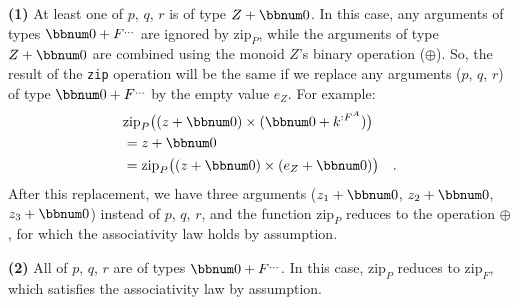 \textbf{(1)} At least one of $p$, $q$, $r$ is of type $Z+\bbnum 0$.
In this case, any arguments of types $\bbnum 0+F^{...}$ are ignored
by $\text{zip}_{P}$, while the arguments of type $Z+\bbnum 0$ are
combined using the monoid $Z$\textsf{'}s binary operation ($\oplus$). So,
the result of the \lstinline!zip! operation will be the same if we
replace any arguments ($p$, $q$, $r$) of type $\bbnum 0+F^{...}$
by the empty value $e_{Z}$. For example:
\begin{align*}
 & \text{zip}_{P}\big((z+\bbnum 0)\times(\bbnum 0+k^{:F^{A}})\big)\\
 & =z+\bbnum 0\\
 & =\text{zip}_{P}\big((z+\bbnum 0)\times(e_{Z}+\bbnum 0)\big)\quad.
\end{align*}
After this replacement, we have three arguments ($z_{1}+\bbnum 0$,
$z_{2}+\bbnum 0$, $z_{3}+\bbnum 0$) instead of $p$, $q$, $r$,
and the function $\text{zip}_{P}$ reduces to the operation $\oplus$,
for which the associativity law holds by assumption.

\textbf{(2)} All of $p$, $q$, $r$ are of types $\bbnum 0+F^{...}$.
In this case, $\text{zip}_{P}$ reduces to $\text{zip}_{F}$, which
satisfies the associativity law by assumption.

